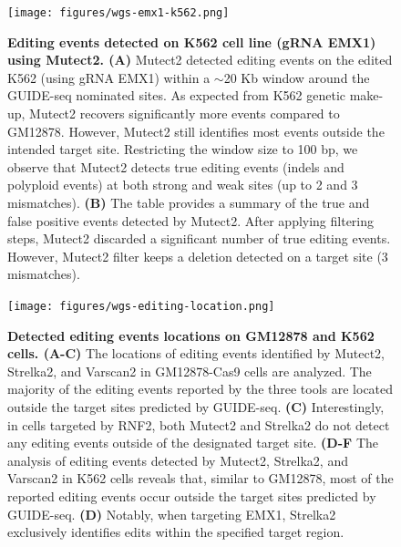 \documentclass[a4paper, titlepage, openright]{book}
\begin{document}
%
\begin{figure}[!]
    \centering
    \texttt{[image: figures/wgs-emx1-k562.png]}
    \caption[Editing events detected on K562 cell line (gRNA EMX1) using Mutect2]{\textbf{Editing events detected on K562 cell line (gRNA EMX1) using Mutect2. (A)}  Mutect2 detected editing events on the edited K562 (using gRNA EMX1) within a $\sim$20 Kb window around the GUIDE-seq nominated sites. As expected from K562 genetic make-up, Mutect2 recovers significantly more events compared to GM12878. However, Mutect2 still identifies most events outside the intended target site. Restricting the window size to 100 bp, we observe that Mutect2 detects true editing events (indels and polyploid events) at both strong and weak sites (up to 2 and 3 mismatches). \textbf{(B)} The table provides a summary of the true and false positive events detected by Mutect2. After applying filtering steps, Mutect2 discarded a significant number of true editing events. However, Mutect2 filter keeps a deletion detected on a target site (3 mismatches).}
    \label{fig:wgs-emx1-k562}
\end{figure}
%
\begin{figure}[!]
    \centering
    \texttt{[image: figures/wgs-editing-location.png]}
    \caption[Detected editing events locations on GM12878 and K562 cells]{\textbf{Detected editing events locations on GM12878 and K562 cells. (A-C)} The locations of editing events identified by Mutect2, Strelka2, and Varscan2 in GM12878-Cas9 cells are analyzed. The majority of the editing events reported by the three tools are located outside the target sites predicted by GUIDE-seq. \textbf{(C)} Interestingly, in cells targeted by RNF2, both Mutect2 and Strelka2 do not detect any editing events outside of the designated target site. \textbf{(D-F} The analysis of editing events detected by Mutect2, Strelka2, and Varscan2 in K562 cells reveals that, similar to GM12878, most of the reported editing events occur outside the target sites predicted by GUIDE-seq. \textbf{(D)} Notably, when targeting EMX1, Strelka2 exclusively identifies edits within the specified target region.}
    \label{fig:wgs-edits-location}
\end{figure}
%
\end{document}
